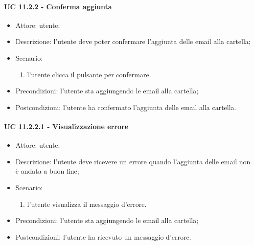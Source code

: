     \paragraph{UC 11.2.2 - Conferma aggiunta}
    \begin{itemize}
        \item Attore: utente;
        \item Descrizione: l'utente deve poter confermare l'aggiunta delle email alla cartella;
        \item Scenario:
        \begin{enumerate}
        \item l'utente clicca il pulsante per confermare.
        \end{enumerate}
        \item Precondizioni: l'utente sta aggiungendo le email alla cartella;
        \item Postcondizioni: l'utente ha confermato l'aggiunta delle email alla cartella.
    \end{itemize}
    \paragraph{UC 11.2.2.1 - Visualizzazione errore}
    \begin{itemize}
        \item Attore: utente;
        \item Descrizione: l'utente deve ricevere un errore quando l'aggiunta delle email non è andata a buon fine;
        \item Scenario:
        \begin{enumerate}
        \item l'utente visualizza il messaggio d'errore.
        \end{enumerate}   
        \item Precondizioni: l'utente sta aggiungendo le email alla cartella;
        \item Postcondizioni: l'utente ha ricevuto un messaggio d'errore.
    \end{itemize}
